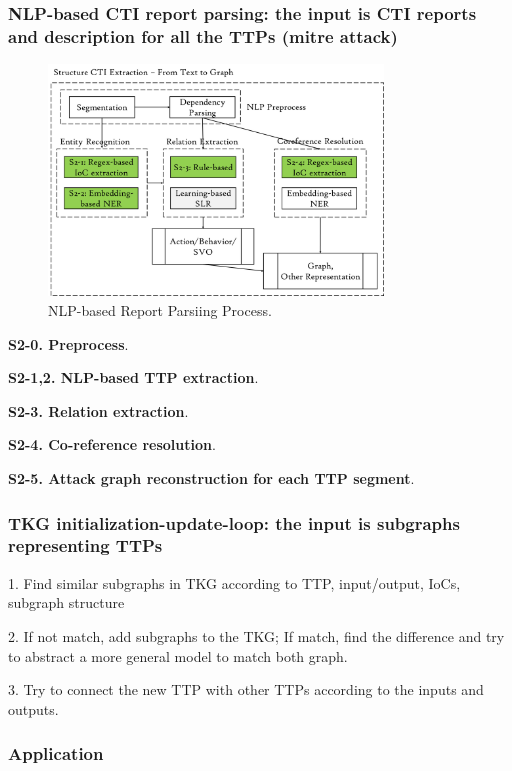 \subsubsection{NLP-based CTI report parsing: the input is CTI reports and description for all the TTPs (mitre attack)}

\begin{figure}
    \centering
    \includegraphics[width=3.5in]{Image/nlp_architecture.png}
    \caption{NLP-based Report Parsiing Process.}
    \label{fig:architecture}
\end{figure}

\textbf{S2-0. Preprocess}.

\textbf{S2-1,2. NLP-based TTP extraction}.

\textbf{S2-3. Relation extraction}.

\textbf{S2-4. Co-reference resolution}.

\textbf{S2-5. Attack graph reconstruction for each TTP segment}.

\subsubsection{TKG initialization-update-loop: the input is subgraphs representing TTPs}

1. Find similar subgraphs in TKG according to TTP, input/output, IoCs, subgraph structure

2. If not match, add subgraphs to the TKG; If match, find the difference and try to abstract a more general model to match both graph.

3. Try to connect the new TTP with other TTPs according to the inputs and outputs.

\subsubsection{Application}
